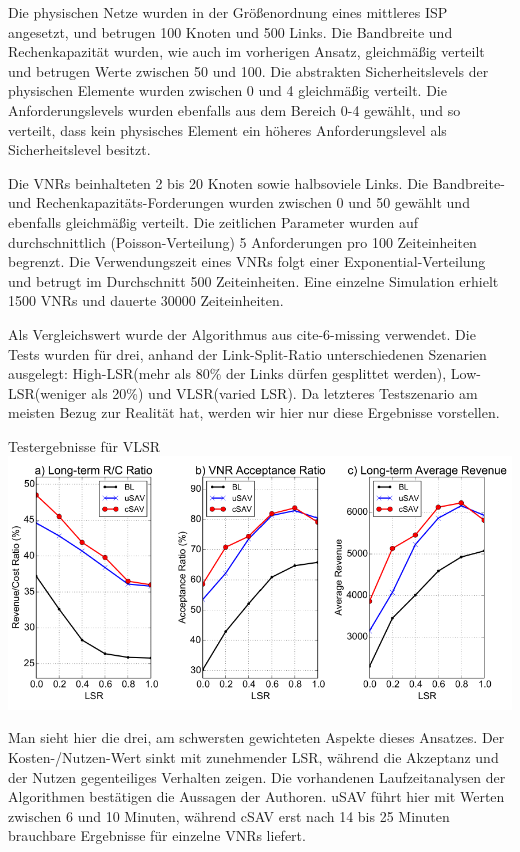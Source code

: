 \documentclass{lni}
\begin{document}
Die physischen Netze wurden in der Größenordnung eines mittleres ISP angesetzt, und betrugen 100 Knoten und 500 Links. Die Bandbreite und Rechenkapazität wurden, wie auch im vorherigen Ansatz, gleichmäßig verteilt und betrugen Werte zwischen 50 und 100. Die abstrakten Sicherheitslevels der physischen Elemente wurden zwischen 0 und 4 gleichmäßig verteilt. Die Anforderungslevels wurden ebenfalls aus dem Bereich 0-4 gewählt, und so verteilt, dass kein physisches Element ein höheres Anforderungslevel als Sicherheitslevel besitzt.

Die VNRs beinhalteten 2 bis 20 Knoten sowie halbsoviele Links. Die Bandbreite- und Rechenkapazitäts-Forderungen wurden zwischen 0 und 50 gewählt und ebenfalls gleichmäßig verteilt.
Die zeitlichen Parameter wurden auf durchschnittlich (Poisson-Verteilung) 5 Anforderungen pro 100 Zeiteinheiten begrenzt. Die Verwendungszeit eines VNRs folgt einer Exponential-Verteilung und betrugt im Durchschnitt 500 Zeiteinheiten. Eine einzelne Simulation erhielt 1500 VNRs und dauerte 30000 Zeiteinheiten. 

Als Vergleichswert wurde der Algorithmus aus cite-6-missing verwendet. Die Tests wurden für drei, anhand der Link-Split-Ratio unterschiedenen Szenarien ausgelegt: 
High-LSR(mehr als 80\% der Links dürfen gesplittet werden),
Low-LSR(weniger als 20\%) und VLSR(varied LSR). Da letzteres Testszenario am meisten Bezug zur Realität hat, werden wir hier nur diese Ergebnisse vorstellen. 

\begin{center}
Testergebnisse für VLSR
	\includegraphics[width=1\textwidth]{perf_algo2.pdf}\newline
\end{center}

Man sieht hier die drei, am schwersten gewichteten Aspekte dieses Ansatzes. Der Kosten-/Nutzen-Wert sinkt mit zunehmender LSR, während die Akzeptanz und der Nutzen gegenteiliges Verhalten zeigen. Die vorhandenen Laufzeitanalysen der Algorithmen bestätigen die Aussagen der Authoren. uSAV führt hier mit Werten zwischen 6 und 10 Minuten, während cSAV erst nach 14 bis 25 Minuten brauchbare Ergebnisse für einzelne VNRs liefert.
\end{document}
